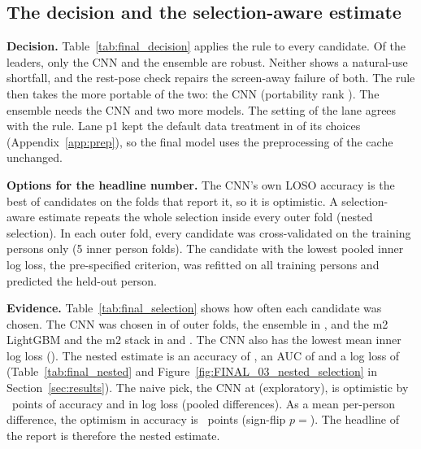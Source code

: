 
\subsection{The decision and the selection-aware estimate}\label{app:final:decision}

\textbf{Decision.}
Table~\ref{tab:final_decision} applies the rule to every candidate.
Of the  leaders, only the CNN and the ensemble are robust.
Neither shows a natural-use shortfall, and the rest-pose check repairs the screen-away failure of both.
The rule then takes the more portable of the two: the CNN (portability rank ).
The ensemble needs the CNN and two more models.
The setting  of the lane agrees with the rule.
Lane p1 kept the default data treatment in  of its  choices (Appendix~\ref{app:prep}), so the final model uses the preprocessing of the cache unchanged.

\textbf{Options for the headline number.}
The CNN's own LOSO accuracy is the best of  candidates on the folds that report it, so it is optimistic.
A selection-aware estimate repeats the whole selection inside every outer fold (nested selection).
In each outer fold, every candidate was cross-validated on the training persons only (5 inner person folds).
The candidate with the lowest pooled inner log loss, the pre-specified criterion, was refitted on all training persons and predicted the held-out person.

\textbf{Evidence.}
Table~\ref{tab:final_selection} shows how often each candidate was chosen.
The CNN was chosen in  of  outer folds, the ensemble in , and the m2 LightGBM and the m2 stack in  and .
The CNN also has the lowest mean inner log loss ().
The nested estimate is an accuracy of , an AUC of  and a log loss of  (Table~\ref{tab:final_nested} and Figure~\ref{fig:FINAL_03_nested_selection} in Section~\ref{sec:results}).
The naive pick, the CNN at  (exploratory), is optimistic by ~points of accuracy and  in log loss (pooled differences).
As a mean per-person difference, the optimism in accuracy is ~points (sign-flip $p = {}$).
The headline of the report is therefore the nested estimate.

